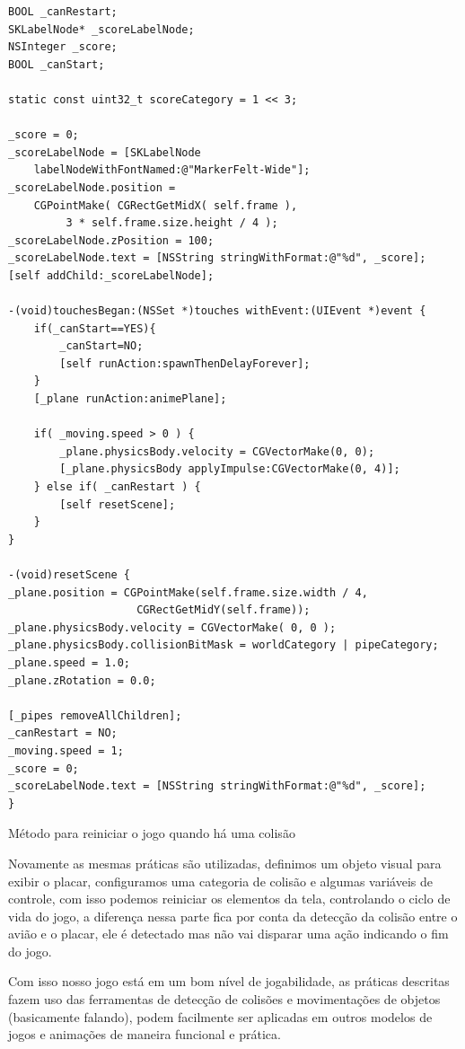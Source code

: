\documentclass[a4paper,12pt,brazil,oneside]{book}
\begin{document}
\begin{listing}[H]
\begin{verbatim}
BOOL _canRestart;
SKLabelNode* _scoreLabelNode;
NSInteger _score;
BOOL _canStart;

static const uint32_t scoreCategory = 1 << 3;

_score = 0;
_scoreLabelNode = [SKLabelNode 
	labelNodeWithFontNamed:@"MarkerFelt-Wide"];
_scoreLabelNode.position = 
	CGPointMake( CGRectGetMidX( self.frame ),
		 3 * self.frame.size.height / 4 );
_scoreLabelNode.zPosition = 100;
_scoreLabelNode.text = [NSString stringWithFormat:@"%d", _score];
[self addChild:_scoreLabelNode];
       
-(void)touchesBegan:(NSSet *)touches withEvent:(UIEvent *)event {
    if(_canStart==YES){
        _canStart=NO;
        [self runAction:spawnThenDelayForever];
    }
    [_plane runAction:animePlane];
    
    if( _moving.speed > 0 ) {
        _plane.physicsBody.velocity = CGVectorMake(0, 0);
        [_plane.physicsBody applyImpulse:CGVectorMake(0, 4)];
    } else if( _canRestart ) {
        [self resetScene];
    }
}

-(void)resetScene {
_plane.position = CGPointMake(self.frame.size.width / 4, 
					CGRectGetMidY(self.frame));
_plane.physicsBody.velocity = CGVectorMake( 0, 0 );
_plane.physicsBody.collisionBitMask = worldCategory | pipeCategory;
_plane.speed = 1.0;
_plane.zRotation = 0.0;
    
[_pipes removeAllChildren];
_canRestart = NO;
_moving.speed = 1;
_score = 0;
_scoreLabelNode.text = [NSString stringWithFormat:@"%d", _score];
}
\end{verbatim}
\caption{Método para reiniciar o jogo quando há uma colisão}
\end{listing}

Novamente as mesmas práticas são utilizadas, definimos um objeto visual para exibir o placar, configuramos uma categoria de colisão e algumas variáveis de controle, com isso podemos reiniciar os elementos da tela, controlando o ciclo de vida do jogo, a diferença nessa parte fica por conta da detecção da colisão entre o avião e o placar, ele é detectado mas não vai disparar uma ação indicando o fim do jogo.

Com isso nosso jogo está em um bom nível de jogabilidade, as práticas descritas fazem uso das ferramentas de detecção de colisões e movimentações de objetos (basicamente falando), podem facilmente ser aplicadas em outros modelos de jogos e animações de maneira funcional e prática.
\end{document}

